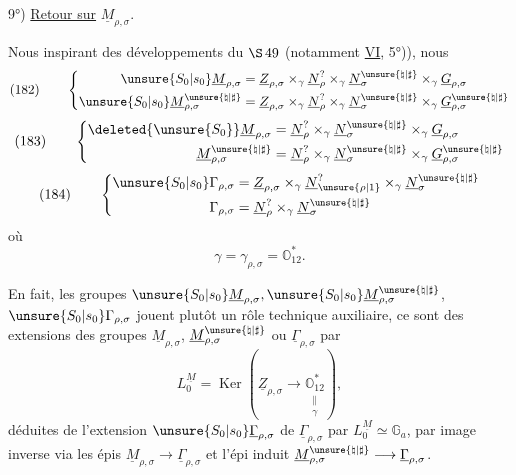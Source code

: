 

9°) \uline{Retour sur} \(\underline M_{\rho,\sigma}\).

Nous inspirant des développements du
\(\S\,49\) (notamment \uline{VI}, 5°)), nous 
\[
(182)\qquad
\left\{
\begin{aligned}
\unsure{S_0|s_0}\underline M_{\rho,\sigma}
&=\underline Z_{\rho,\sigma}
\times_\gamma\underline N_\rho^{?}
\times_\gamma\underline N_\sigma^{\unsure{\natural|\sharp}}
\times_\gamma\underline G_{\rho,\sigma}\\
\unsure{S_0|s_0}\underline M_{\rho,\sigma}^{\unsure{\natural|\sharp}}
&=\underline Z_{\rho,\sigma}
\times_\gamma\underline N_\rho^{?}
\times_\gamma\underline N_\sigma^{\unsure{\natural|\sharp}}
\times_\gamma\underline G_{\rho,\sigma}^{\unsure{\natural|\sharp}}
\end{aligned}
\right.
\]
\[
(183)\qquad
\left\{
\begin{aligned}
\deleted{\unsure{S_0}}\underline M_{\rho,\sigma}
&=\underline N_\rho^{?}
\times_\gamma\underline N_\sigma^{\unsure{\natural|\sharp}}
\times_\gamma\underline G_{\rho,\sigma}\\
\underline M_{\rho,\sigma}^{\unsure{\natural|\sharp}}
&=\underline N_\rho^{?}
\times_\gamma\underline N_\sigma^{\unsure{\natural|\sharp}}
\times_\gamma\underline G_{\rho,\sigma}^{\unsure{\natural|\sharp}}
\end{aligned}
\right.
\]
\[
(184)\qquad
\left\{
\begin{aligned}
\unsure{S_0|s_0}\Gamma_{\rho,\sigma}
&=\underline Z_{\rho,\sigma}
\times_\gamma\underline N_{\unsure{\rho|1}}^{?}
\times_\gamma\underline N_\sigma^{\unsure{\natural|\sharp}}\\
\Gamma_{\rho,\sigma}
&=\underline N_\rho^{?}
\times_\gamma\underline N_\sigma^{\unsure{\natural|\sharp}}
\end{aligned}
\right.
\]
où \deleted{\(\unsure{\gamma=}\)}
\[
\gamma=\gamma_{\rho,\sigma}=\mathbb O_{12}^{*}.
\]

En fait, les groupes
\(\unsure{S_0|s_0}\underline M_{\rho,\sigma},
\unsure{S_0|s_0}\underline M_{\rho,\sigma}^{\unsure{\natural|\sharp}}\),
\(\unsure{S_0|s_0}\Gamma_{\rho,\sigma}\)
jouent plutôt un rôle technique auxiliaire, ce sont des extensions des
groupes \(\underline M_{\rho,\sigma}\),
\(\underline M_{\rho,\sigma}^{\unsure{\natural|\sharp}}\)
ou \(\underline\Gamma_{\rho,\sigma}\) par
\[
L_0^{\underline M}
=\operatorname{Ker}\left(
\underline Z_{\rho,\sigma}\longrightarrow
\underset{\substack{\parallel\\\gamma}}{\mathbb O_{12}^{*}}
\right),
\]
déduites
de l'extension
\(\unsure{S_0|s_0}\underline\Gamma_{\rho,\sigma}\)
de \(\underline\Gamma_{\rho,\sigma}\) par
\(L_0^{\underline M}\simeq\mathbb G_a\),
par image inverse via les épis
\(\underline M_{\rho,\sigma}\longrightarrow\underline\Gamma_{\rho,\sigma}\)
et l'épi induit
\(\underline M_{\rho,\sigma}^{\unsure{\natural|\sharp}}
\longrightarrow\underline\Gamma_{\rho,\sigma}\).

